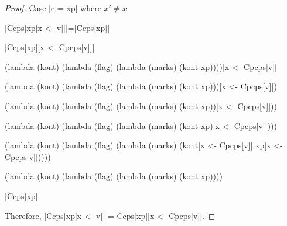 \begin{proof}{Case \scheme|e = xp| where $x'\ne x$}

\scheme|Ccps[xp[x <- v]]|=\scheme|Ccps[xp]|

\scheme|Ccps[xp][x <- Cpcps[v]]|

\begin{schemeblock}
\begin{schemedisplay}
(lambda (kont)
  (lambda (flag)
    (lambda (marks)
      (kont xp))))[x <- Cpcps[v]]
\end{schemedisplay}
\end{schemeblock}

\begin{schemeblock}
\begin{schemedisplay}
(lambda (kont)
  (lambda (flag)
    (lambda (marks)
      (kont xp)))[x <- Cpcps[v]])
\end{schemedisplay}
\end{schemeblock}

\begin{schemeblock}
\begin{schemedisplay}
(lambda (kont)
  (lambda (flag)
    (lambda (marks)
      (kont xp))[x <- Cpcps[v]]))
\end{schemedisplay}
\end{schemeblock}

\begin{schemeblock}
\begin{schemedisplay}
(lambda (kont)
  (lambda (flag)
    (lambda (marks)
      (kont xp)[x <- Cpcps[v]])))
\end{schemedisplay}
\end{schemeblock}

\begin{schemeblock}
\begin{schemedisplay}
(lambda (kont)
  (lambda (flag)
    (lambda (marks)
      (kont[x <- Cpcps[v]] xp[x <- Cpcps[v]]))))
\end{schemedisplay}
\end{schemeblock}

\begin{schemeblock}
\begin{schemedisplay}
(lambda (kont)
  (lambda (flag)
    (lambda (marks)
      (kont xp))))
\end{schemedisplay}
\end{schemeblock}

\noindent
\scheme|Ccps[xp]|

Therefore, \scheme|Ccps[xp[x <- v]] = Ccps[xp][x <- Cpcps[v]|.
\end{proof}

